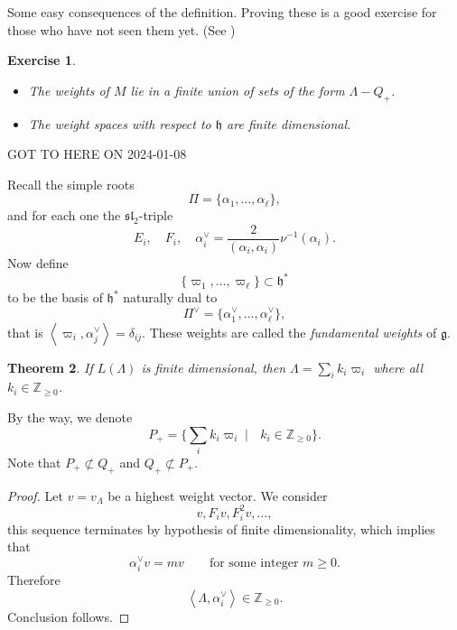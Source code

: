 \documentclass[12pt]{article}
\theoremstyle{plain}
\newtheorem{thm}{Theorem}[section]
\newtheorem{exer}[thm]{Exercise}
\theoremstyle{definition}
\numberwithin{equation}{section}
\newcommand{\al}{\alpha}
\newcommand{\La}{\Lambda}
\newcommand{\Z}{\mathbb{Z}}
\newcommand{\g}{\mathfrak{g}}
\newcommand{\h}{\mathfrak{h}}
\newcommand{\sll}{\mathfrak{sl}}
\newcommand{\OO}{\mathcal{O}}
\begin{document}
Some easy consequences of the definition. Proving these is a good exercise for those who have not seen them yet. (See {\cite[Chapter 0]{humbgg}})
\begin{exer}
{\ }
\begin{itemize}
\item The weights of $M$ lie in a finite union of sets of the form $\La - Q_+$.

\item The weight spaces with respect to $\h$ are finite dimensional.
\end{itemize}
\end{exer}


{\color{red}GOT TO HERE ON 2024-01-08}






Recall the simple roots
\[
\Pi = \{\al_1, \ldots, \al_\ell\},
\]
and for each one the $\sll_2$-triple
\[
E_i, \quad F_i, \quad \al_i^\vee = \frac{2}{(\al_i, \al_i)} \nu^{-1}(\al_i).
\]
Now define
\[
\{\varpi_1, \ldots, \varpi_\ell\} \subset \h^*
\]
to be the basis of $\h^*$ naturally dual to
\[
\Pi^\vee = \{\al_1^\vee, \ldots, \al_\ell^\vee\},
\]
that is $\left< \varpi_i, \al_j^\vee \right> = \delta_{ij}$. These weights are called the \emph{fundamental weights} of $\g$.


\begin{thm}
If $L(\La)$ is finite dimensional, then $\La = \sum_i k_i \varpi_i$ where all $k_i \in \Z_{\geq 0}$.
\end{thm}

By the way, we denote
\[
P_+ = \{ \sum_i k_i \varpi_i \mid \text{ $k_i \in \Z_{\geq 0}$}\}.
\]
Note that $P_+ \not\subset Q_+$ and $Q_+ \not\subset P_+$.


\begin{proof}
Let $v = v_\La$ be a highest weight vector. We consider
\[
v, F_i v, F_i^2 v, \ldots,
\]
this sequence terminates by hypothesis of finite dimensionality, which implies that
\[
\al_i^\vee v = m v \qquad \text{for some integer $m \geq 0$}.
\]
Therefore
\[
\left<\Lambda, \al_i^\vee\right> \in \Z_{\geq 0}.
\]
Conclusion follows.
\end{proof}
\end{document}
